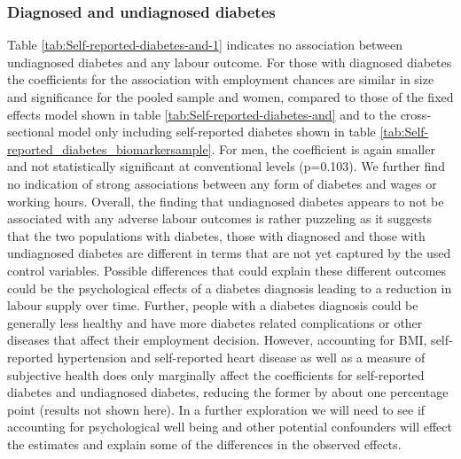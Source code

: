 \subsubsection*{Diagnosed and undiagnosed diabetes}

Table \ref{tab:Self-reported-diabetes-and-1}
indicates no association between undiagnosed
diabetes and any labour outcome. For those with diagnosed
diabetes the coefficients for the association with employment chances
are similar in size and significance for the pooled sample and women,
compared to those of the fixed effects model shown in table \ref{tab:Self-reported-diabetes-and} and to the cross-sectional model only including self-reported diabetes shown in table \ref{tab:Self-reported_diabetes_biomarkersample}.
For men, the coefficient is again smaller and not statistically significant
at conventional levels (p=0.103). We further find no indication of strong associations
between any form of diabetes and wages or working hours. 
Overall, the finding that undiagnosed diabetes appears to not be associated with any adverse labour outcomes is rather puzzeling as it suggests that the two populations with diabetes, those with diagnosed and those with undiagnosed diabetes are different in terms that are not yet captured by the used control variables. Possible differences that could explain these different outcomes could be the psychological effects of a diabetes diagnosis leading to a reduction in labour supply over time. Further, people with a diabetes diagnosis could be generally less healthy and have more diabetes related complications or other diseases that affect their employment decision. However, accounting for BMI, self-reported hypertension and self-reported heart disease as well as a measure of subjective health does only marginally affect the coefficients for self-reported diabetes and undiagnosed diabetes, reducing the former by about one percentage point (results not shown here). In a further exploration we will need to see if accounting for psychological well being and other potential confounders will effect the estimates and explain some of the differences in the observed effects.

